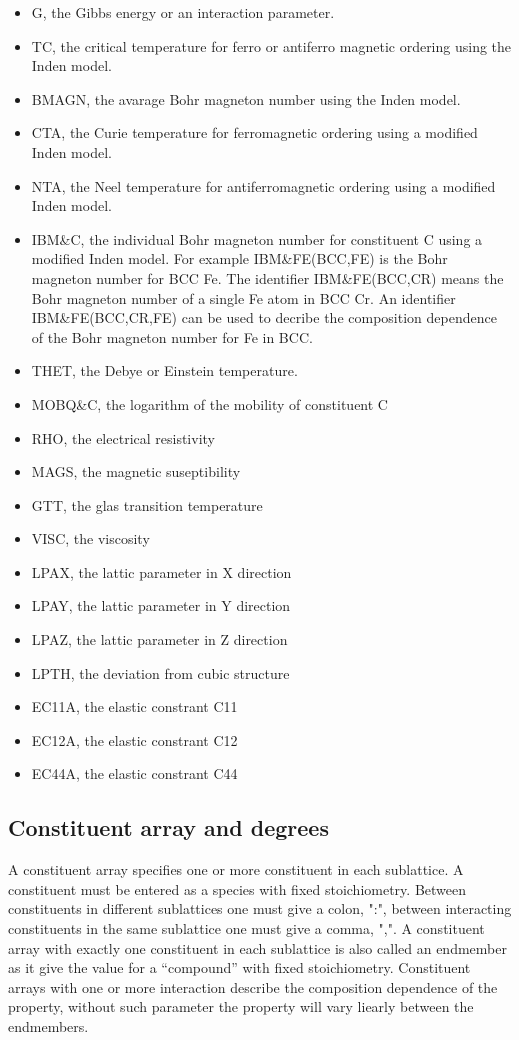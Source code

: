 \documentclass[12pt]{article}
\begin{document}
\begin{itemize}
\item G, the Gibbs energy or an interaction parameter.
\item TC, the critical temperature for ferro or antiferro magnetic
ordering using the Inden model.
\item BMAGN, the avarage Bohr magneton number using the Inden model.
\item CTA, the Curie temperature for ferromagnetic ordering using
a modified Inden model.
\item NTA, the Neel temperature for antiferromagnetic ordering using a
modified Inden model.
\item IBM\&C, the individual Bohr magneton number for constituent C
using a modified Inden model.  For example IBM\&FE(BCC,FE) is the Bohr
magneton number for BCC Fe.  The identifier IBM\&FE(BCC,CR) means the
Bohr magneton number of a single Fe atom in BCC Cr.  An identifier
IBM\&FE(BCC,CR,FE) can be used to decribe the composition dependence of
the Bohr magneton number for Fe in BCC.
\item THET, the Debye or Einstein temperature.
\item MOBQ\&C, the logarithm of the mobility of constituent C
\item RHO, the electrical resistivity
\item MAGS, the magnetic suseptibility
\item GTT, the glas transition temperature
\item VISC, the viscosity
\item LPAX, the lattic parameter in X direction
\item LPAY, the lattic parameter in Y direction
\item LPAZ, the lattic parameter in Z direction
\item LPTH, the deviation from cubic structure
\item EC11A, the elastic constrant C11
\item EC12A, the elastic constrant C12
\item EC44A, the elastic constrant C44
\end{itemize}

\subsection{Constituent array and degrees}

A constituent array specifies one or more constituent in each
sublattice.  A constituent must be entered as a species with fixed
stoichiometry.  Between constituents in different sublattices one must
give a colon, ":", between interacting constituents in the same
sublattice one must give a comma, ",".  A constituent array with
exactly one constituent in each sublattice is also called an endmember
as it give the value for a ``compound'' with fixed stoichiometry.
Constituent arrays with one or more interaction describe the
composition dependence of the property, without such parameter the
property will vary liearly between the endmembers.
\end{document}
